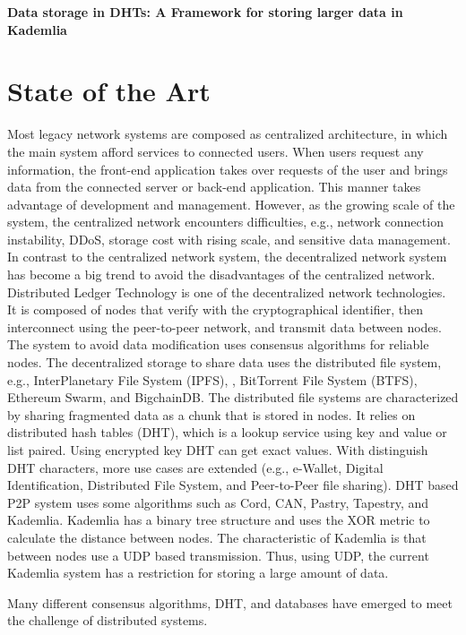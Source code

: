 \documentclass{article}
\begin{document}


{\huge  \textbf {Data storage in DHTs: A Framework for storing larger data in Kademlia}}\\
\section{State of the Art}
Most legacy network systems are composed as centralized architecture, in which the main system afford services to connected users. When users request any information, the front-end application takes over requests of the user and brings data from the connected server or back-end application. This manner takes advantage of development and management. However, as the growing scale of the system, the centralized network encounters difficulties, e.g., network connection instability, DDoS, storage cost with rising scale, and sensitive data management. In contrast to the centralized network system, the decentralized network system has become a big trend to avoid the disadvantages of the centralized network. 
Distributed Ledger Technology is one of the decentralized network technologies. It is composed of nodes that verify with the cryptographical identifier, then interconnect using the peer-to-peer network, and transmit data between nodes. The system to avoid data modification uses consensus algorithms for reliable nodes. The decentralized storage to share data uses the distributed file system, e.g., InterPlanetary File System (IPFS),  \cite{IPFS}\cite{benet2014ipfs}, BitTorrent File System (BTFS)\cite{BTFS}, Ethereum Swarm, and BigchainDB. The distributed file systems are characterized by sharing fragmented data as a chunk that is stored in nodes. It relies on distributed hash tables (DHT)\cite{sivaraja2008efficient}, which is a lookup service using key and value or list paired. Using encrypted key DHT can get exact values. With distinguish DHT characters, more use cases are extended (e.g., e-Wallet, Digital Identification, Distributed File System, and Peer-to-Peer file sharing). DHT based P2P system uses some algorithms such as Cord, CAN, Pastry, Tapestry, and Kademlia. Kademlia has a binary tree structure and uses the XOR metric to calculate the distance between nodes. The characteristic of Kademlia is that between nodes use a UDP based transmission. Thus, using UDP, the current Kademlia system has a restriction for storing a large amount of data. 

Many different consensus algorithms, DHT, and databases have emerged to meet the challenge of distributed systems.
\end{document}
